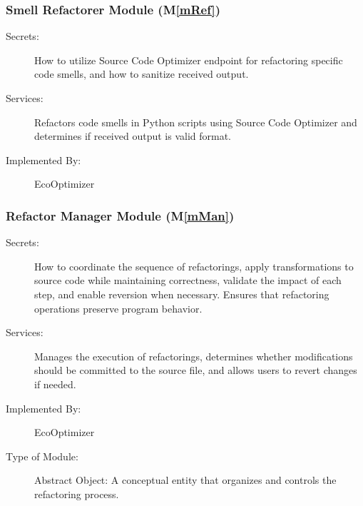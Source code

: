 \documentclass[12pt, titlepage]{article}
\newcommand{\mref}[1]{M\ref{#1}}
\begin{document}
\subsubsection{Smell Refactorer Module (\mref{mRef})}


\begin{description}
    \item[Secrets:] How to utilize Source Code Optimizer endpoint for refactoring specific code smells, and how to sanitize received output.
    \item[Services:] Refactors code smells in Python scripts using Source Code Optimizer and determines if received output is valid format.
    \item[Implemented By:] EcoOptimizer
\end{description}


\subsubsection{Refactor Manager Module (\mref{mMan})}

\begin{description}
    \item[Secrets:] How to coordinate the sequence of refactorings, apply transformations to source code while maintaining correctness, validate the impact of each step, and enable reversion when necessary. Ensures that refactoring operations preserve program behavior.

    \item[Services:] Manages the execution of refactorings, determines whether modifications should be committed to the source file, and allows users to revert changes if needed.

    \item[Implemented By:] EcoOptimizer
    \item[Type of Module:] Abstract Object: A conceptual entity that organizes and controls the refactoring process.
\end{description}
\end{document}
